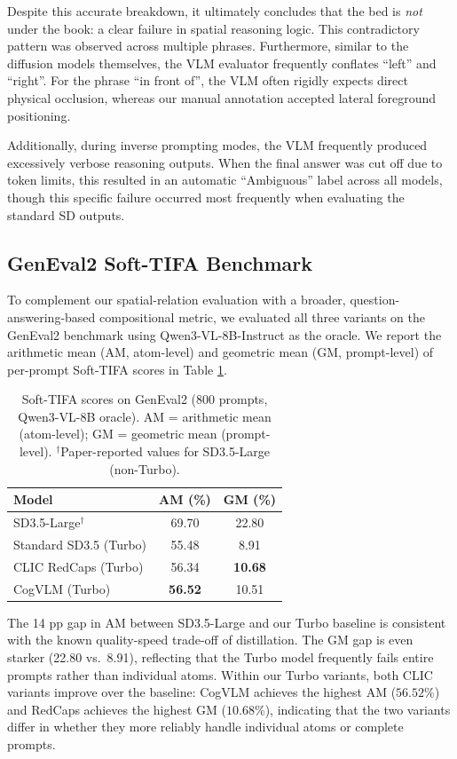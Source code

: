 Despite this accurate breakdown, it ultimately concludes that the bed is \textit{not} under the book: a clear failure in spatial reasoning logic. This contradictory pattern was observed across multiple phrases. Furthermore, similar to the diffusion models themselves, the VLM evaluator frequently conflates ``left'' and ``right''. For the phrase ``in front of'', the VLM often rigidly expects direct physical occlusion, whereas our manual annotation accepted lateral foreground positioning. 

Additionally, during inverse prompting modes, the VLM frequently produced excessively verbose reasoning outputs. When the final answer was cut off due to token limits, this resulted in an automatic ``Ambiguous'' label across all models, though this specific failure occurred most frequently when evaluating the standard SD outputs.

\subsection{GenEval2 Soft-TIFA Benchmark}
To complement our spatial-relation evaluation with a broader, question-answering-based compositional metric, we evaluated all three variants on the GenEval2 benchmark \citep{kamath2025geneval} using Qwen3-VL-8B-Instruct as the oracle. We report the arithmetic mean (AM, atom-level) and geometric mean (GM, prompt-level) of per-prompt Soft-TIFA scores in Table \ref{tab:tifa}.

\begin{table}[ht]
\caption{Soft-TIFA scores on GenEval2 (800 prompts, Qwen3-VL-8B oracle). AM = arithmetic mean (atom-level); GM = geometric mean (prompt-level). $^\dagger$Paper-reported values for SD3.5-Large (non-Turbo).}
\label{tab:tifa}
\begin{center}
\begin{small}
\begin{tabular}{lcc}
\toprule
\textbf{Model} & \textbf{AM (\%)} & \textbf{GM (\%)} \\
\midrule
SD3.5-Large$^\dagger$ \citep{kamath2025geneval} & 69.70 & 22.80 \\
\midrule
Standard SD3.5 (Turbo)  & 55.48 & 8.91  \\
CLIC RedCaps (Turbo)    & 56.34 & \textbf{10.68} \\
CogVLM (Turbo)          & \textbf{56.52} & 10.51 \\
\bottomrule
\end{tabular}
\end{small}
\end{center}
\end{table}

The 14 pp gap in AM between SD3.5-Large and our Turbo baseline is consistent with the known quality-speed trade-off of distillation. The GM gap is even starker (22.80 vs.\ 8.91), reflecting that the Turbo model frequently fails entire prompts rather than individual atoms. Within our Turbo variants, both CLIC variants improve over the baseline: CogVLM achieves the highest AM ($56.52\%$) and RedCaps achieves the highest GM ($10.68\%$), indicating that the two variants differ in whether they more reliably handle individual atoms or complete prompts.